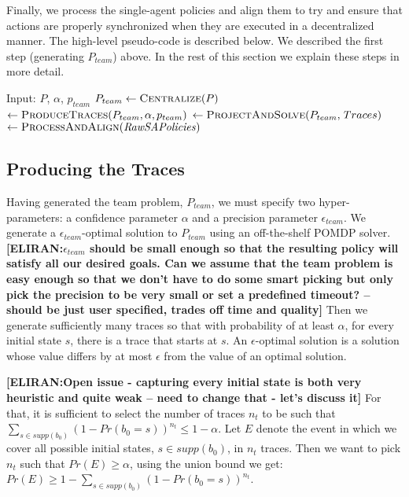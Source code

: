 \documentclass[letterpaper]{article} %
\newcommand{\eliran}[1]{\textbf{[\color{red}ELIRAN:#1]}}
\begin{document}
Finally, we process the single-agent policies and align them to try and ensure that actions are properly synchronized when they are executed in a decentralized manner. The high-level pseudo-code is described below. We described the first step (generating $P_{team}$) above. In the rest of this section we explain these steps in more detail.

\begin{algorithm}
\caption{GenerateAgentPolicies \eliran{keep this?}}
\begin{algorithmic}[tbph]
\State Input: $P$, $\alpha$, $p_{team}$
\State $P_{team} \gets \Call{Centralize}{P}$
 $\gets \Call{ProduceTraces}{P_{team}, \alpha, p_{team}}$
$ \gets \Call{ProjectAndSolve}{P_{team},{\mathit Traces}}$
 $\gets \Call{ProcessAndAlign}{\mathit{RawSAPolicies}}$
\end{algorithmic}
\end{algorithm}

\subsection{Producing the Traces}

Having generated the team problem, $P_{team}$, we 
must specify two hyper-parameters: a confidence parameter $\alpha$ and a precision parameter $\epsilon_{team}$. We generate a $\epsilon_{team}$-optimal solution
to $P_{team}$ using an off-the-shelf POMDP solver. \eliran{$\epsilon_{team}$ should be small enough so that the resulting policy will satisfy all \textbf{our} desired goals. Can we assume that the team problem is easy enough so that we don't have to do some smart picking but only pick the precision to be very small or set a predefined timeout? -- should be just user specified, trades off time and quality}
Then we generate sufficiently many traces so that with probability of at least $\alpha$, for every initial state $s$, there is a trace that starts at $s$. An $\epsilon$-optimal solution is a solution whose value differs by at most $\epsilon$ from the value of an optimal solution.

\eliran{Open issue - capturing every initial state is both very heuristic and quite weak -- need to change that - let's discuss it}
For that, it is sufficient to select the number of traces $n_t$ to be such that $\sum_{s\in supp(b_0)}(1-Pr(b_0=s))^{n_t} \leq 1-\alpha$.
Let $E$ denote the event in which we cover all possible initial states, $s \in supp(b_0)$, in $n_t$ traces. Then we want to pick $n_t$ such that $Pr(E)\geq \alpha$, using the union bound we get: $Pr(E)\geq 1-\sum_{s\in supp(b_0)}(1-Pr(b_0=s))^{n_t}$.
\end{document}
